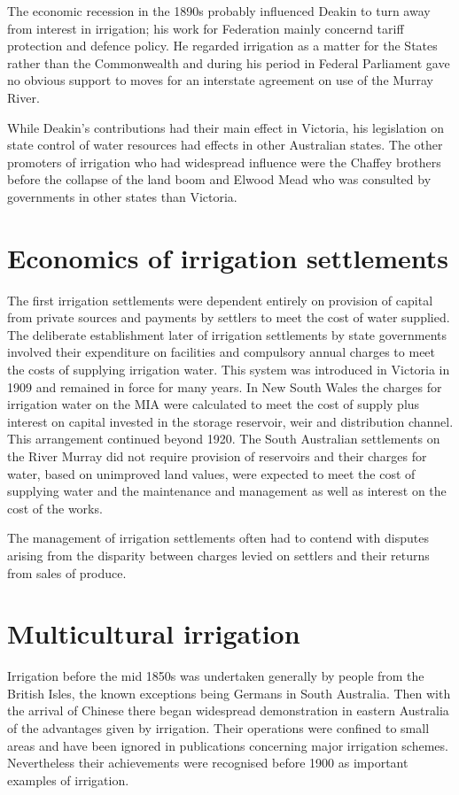 The economic recession in the 1890s probably influenced Deakin to turn
away from interest in irrigation; his work for Federation mainly
concernd tariff protection and defence policy.  He regarded irrigation
as a matter for the States rather than the Commonwealth and during his
period in Federal Parliament gave no obvious support to moves for an
interstate agreement on use of the Murray River.

While Deakin's contributions had their main effect in Victoria, his
legislation on state control of water resources had effects in other
Australian states.  The other promoters of irrigation who had
widespread influence were the Chaffey brothers before the collapse of
the land boom and Elwood Mead who was consulted by governments in
other states than Victoria.

\section{Economics of irrigation settlements}

The first irrigation settlements were dependent entirely on provision
of capital from private sources and payments by settlers to meet the
cost of water supplied.  The deliberate establishment later of
irrigation settlements by state governments involved their expenditure
on facilities and compulsory annual charges to meet the costs of
supplying irrigation water.  This system was introduced in Victoria in
1909 and remained in force for many years.  In New South Wales the
charges for irrigation water on the MIA were calculated to meet the
cost of supply plus interest on capital invested in the storage
reservoir, weir and distribution channel.  This arrangement continued
beyond 1920.  The South Australian settlements on the River Murray did
not require provision of reservoirs and their charges for water, based
on unimproved land values, were expected to meet the cost of supplying
water and the maintenance and management as well as interest on the
cost of the works.

The management of irrigation settlements often had to contend with
disputes arising from the disparity between charges levied on settlers
and their returns from sales of produce.

\section{Multicultural irrigation}

Irrigation before the mid 1850s was undertaken generally by people
from the British Isles, the known exceptions being Germans in South
Australia.  Then with the arrival of Chinese there began widespread
demonstration in eastern Australia of the advantages given by
irrigation.  Their operations were confined to small areas and have
been ignored in publications concerning major irrigation schemes.
Nevertheless their achievements were recognised before 1900 as
important examples of irrigation.

